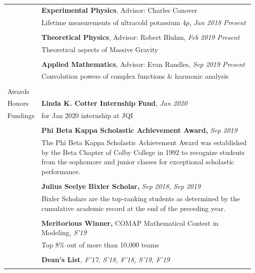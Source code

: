 \documentclass[10pt]{article}
\begin{document}
\begin{longtable}{ l m{13.5cm}   }
	& \textbf{Experimental Physics}, Advisor: Charles Conover \\
	& Lifetime measurements of ultracold potassium $4p$, \textit{Jan 2018 \textendash Present}\\
	& \\
	
	& \textbf{Theoretical Physics}, Advisor: Robert Bluhm, \textit{Feb 2019 \textendash Present}\\
	& Theoretical aspects of Massive Gravity\\
	& \\
	
	& \textbf{Applied Mathematics}, Advisor: Evan Randles, \textit{Sep 2019 \textendash Present}\\
	& Convolution powers of complex functions \& harmonic analysis\\
	& \\
     					
     					



\large{Awards}    	& \\
\large{Honors}		& \textbf{Linda K. Cotter Internship Fund}, \textit{Jan 2020}\\
\large{Fundings}		& for Jan 2020 internship at JQI\\
&\\
& \textbf{Phi Beta Kappa Scholastic Achievement Award,} \textit{Sep 2019}\\
& The Phi Beta Kappa Scholastic Achievement Award was established by the Beta Chapter of Colby College in 1992 to recognize students from the sophomore and junior classes for exceptional scholastic performance.\\
&\\
& \textbf{Julius Seelye Bixler Scholar,} \textit{Sep 2018, Sep 2019}\\
& Bixler Scholars are the top-ranking students as determined by the cumulative academic record at the end of the preceding year.\\
&\\
& \textbf{Meritorious Winner,}  COMAP Mathematical Contest in Modeling, \textit{S'19}\\
& Top 8\% out of more than 10,000 teams\\
&\\
& \textbf{Dean’s List}, \textit{F'17, S'18, F'18, S'19, F'19}\\
&\\
		
  
   						

\end{longtable}
\end{document}
